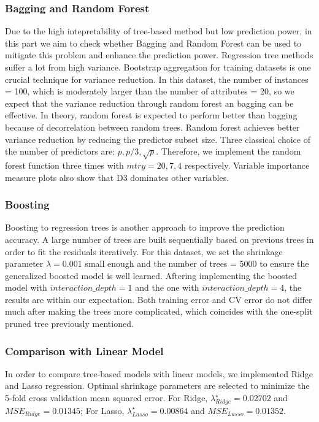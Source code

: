 \documentclass{article}
\begin{document}
\subsubsection{Bagging and Random Forest}
Due to the high intepretability of tree-based method but low prediction power, in this part we aim to check whether Bagging and Random Forest can be used to mitigate this problem and enhance the prediction power.
Regression tree methods suffer a lot from high variance. Bootstrap aggregation for training datasets is one crucial technique for variance reduction. In this dataset, the number of instances = 100, which is moderately larger than the number of attributes = 20, so we expect that the variance reduction through random forest an bagging can be effective.
In theory, random forest is expected to perform better than bagging because of decorrelation between random trees.
Random forest achieves better variance reduction by reducing the predictor subset size. Three classical choice of the number of predictors are: $p, p/3, \sqrt{p}$. Therefore, we implement the random forest function three times with $mtry = 20, 7, 4$ respectively. Variable importance measure plots also show that D3 dominates other variables.

\subsubsection{Boosting}
Boosting to regression trees is another approach to improve the prediction accuracy. A large number of trees are built sequentially based on previous trees in order to fit the residuals iteratively. For this dataset, we set the shrinkage parameter $\lambda = 0.001$ small enough and the number of trees = 5000 to ensure the generalized boosted model is well learned. Aftering implementing the boosted model with $interaction\_depth = 1$ and the one with $interaction\_depth = 4$, the results are within our expectation. Both training error and CV error do not differ much after making the trees more complicated, which coincides with the one-split pruned tree previously mentioned.

\subsubsection{Comparison with Linear Model}
In order to compare tree-based models with linear models, we implemented Ridge and Lasso regression. Optimal shrinkage parameters are selected to minimize the 5-fold cross validation mean squared error. For Ridge, $\lambda_{Ridge}^{\star} = 0.02702$ and $MSE_{Ridge} = 0.01345$; For Lasso, $\lambda_{Lasso}^{\star} = 0.00864$ and $MSE_{Lasso} = 0.01352$.
\end{document}
